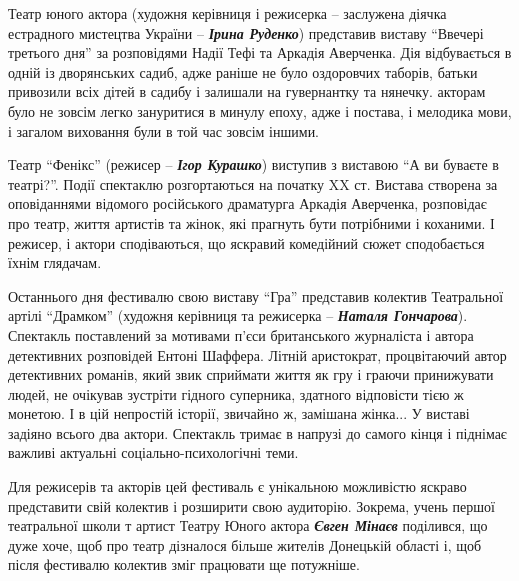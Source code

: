 Театр юного актора (художня керівниця і режисерка – заслужена діячка естрадного
мистецтва України – \emph{\textbf{Ірина Руденко}}) представив виставу \enquote{Ввечері третього
дня} за розповідями Надії Тефі та Аркадія Аверченка. Дія відбувається в одній
із дворянських садиб, адже раніше не було оздоровчих таборів, батьки привозили
всіх дітей в садибу і залишали на гувернантку та нянечку. акторам  було не
зовсім легко зануритися в минулу епоху, адже і постава, і мелодика мови, і
загалом виховання були в той час зовсім іншими.


Театр \enquote{Фенікс} (режисер – \emph{\textbf{Ігор Курашко}}) виступив з виставою \enquote{А ви буваєте в
театрі?}. Події спектаклю розгортаються на початку XX ст. Вистава створена за
оповіданнями відомого російського драматурга Аркадія Аверченка, розповідає про
театр, життя артистів та жінок, які прагнуть бути потрібними і коханими. І
режисер, і актори сподіваються, що яскравий комедійний сюжет сподобається їхнім
глядачам.


Останнього дня фестивалю свою виставу \enquote{Гра} представив колектив Театральної
артілі \enquote{Драмком} (художня керівниця та режисерка – \emph{\textbf{Наталя Гончарова}}). Спектакль
поставлений за мотивами п'єси британського журналіста і автора детективних
розповідей Ентоні Шаффера. Літній аристократ, процвітаючий автор детективних
романів, який звик сприймати життя як гру і граючи принижувати людей, не
очікував зустріти гідного суперника, здатного відповісти тією ж монетою. І в
цій непростій історії, звичайно ж, замішана жінка... У виставі задіяно всього
два актори. Спектакль тримає в напрузі до самого кінця і піднімає важливі
актуальні соціально-психологічні теми.

Для режисерів та акторів цей фестиваль є унікальною можливістю яскраво
представити свій колектив і розширити свою аудиторію. Зокрема, учень першої
театральної школи т артист Театру Юного актора \emph{\textbf{Євген Мінаєв}} поділився, що дуже
хоче, щоб про театр дізналося більше жителів Донецькій області і, щоб після
фестивалю колектив зміг працювати ще потужніше.


